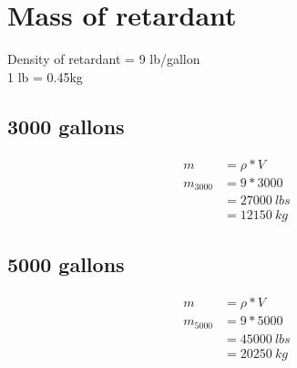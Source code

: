 \chapter{Mass of retardant}

Density of retardant = 9 lb/gallon \\ 
1 lb = 0.45kg

\section{3000 gallons}
\begin{equation}
\begin{split}
  m & = \rho * V \\
  m_{3000} & = 9 * 3000 \\
  & = 27000 \ lbs \\
  & = 12150 \ kg 
\end{split}
\end{equation}

\section{5000 gallons}
\begin{equation}
\begin{split}
  m & = \rho * V \\
  m_{5000} & = 9 * 5000 \\
  & = 45000 \ lbs \\
  & = 20250 \ kg 
\end{split}
\end{equation}
